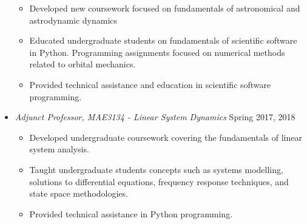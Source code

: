 \begin{itemize}
\begin{itemize}
                \item Developed new coursework focused on fundamentals of astronomical and astrodynamic dynamics
                \item Educated undergraduate students on fundamentals of scientific software in Python. 
                    Programming assignments focused on numerical methods related to orbital mechanics.
                \item Provided technical assistance and education in scientific software programming. 
            \end{itemize}
        \item[] \textit{Adjunct Professor, MAE3134 - Linear System Dynamics} \hfill {Spring 2017, 2018}
        \begin{itemize}
            \item Developed undergraduate coursework covering the fundamentals of linear system analysis.
            \item Taught undergraduate students concepts such as systems modelling, solutions to differential equations, frequency response techniques, and state space methodologies. 
            \item Provided technical assistance in Python programming.
        \end{itemize}
    \end{itemize}
    

